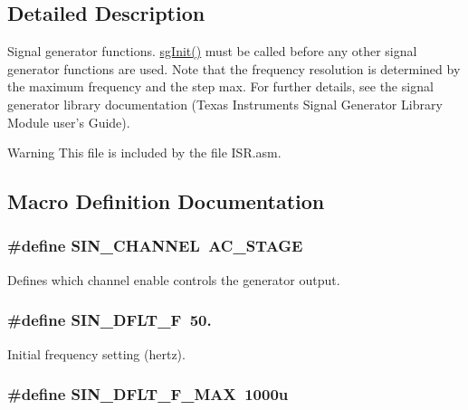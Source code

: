 \subsection{Detailed Description}
Signal generator functions. \hyperlink{a00032_a41e810f7181a4ecaa5bc5f0713c6db89}{sg\-Init()} must be called before any other signal generator functions are used. Note that the frequency resolution is determined by the maximum frequency and the step max. For further details, see the signal generator library documentation (Texas Instruments Signal Generator Library Module user's Guide).

\begin{DoxyWarning}{Warning}
This file is included by the file I\-S\-R.\-asm. 
\end{DoxyWarning}


\subsection{Macro Definition Documentation}
\hypertarget{a00032_a71b6211a4d077af219d7e503f17114d1}{
\subsubsection[{S\-I\-N\-\_\-\-C\-H\-A\-N\-N\-E\-L}]{\setlength{\rightskip}{0pt plus 5cm}\#define S\-I\-N\-\_\-\-C\-H\-A\-N\-N\-E\-L~{\bf A\-C\-\_\-\-S\-T\-A\-G\-E}}}\label{a00032_a71b6211a4d077af219d7e503f17114d1}
Defines which channel enable controls the generator output. \hypertarget{a00032_aa1d98c477c6de604fc6ca986f2d83238}{
\subsubsection[{S\-I\-N\-\_\-\-D\-F\-L\-T\-\_\-\-F}]{\setlength{\rightskip}{0pt plus 5cm}\#define S\-I\-N\-\_\-\-D\-F\-L\-T\-\_\-\-F~50.}}\label{a00032_aa1d98c477c6de604fc6ca986f2d83238}
Initial frequency setting (hertz). \hypertarget{a00032_a1640e33dcd5a970b4a9731ec68125bd6}{
\subsubsection[{S\-I\-N\-\_\-\-D\-F\-L\-T\-\_\-\-F\-\_\-\-M\-A\-X}]{\setlength{\rightskip}{0pt plus 5cm}\#define S\-I\-N\-\_\-\-D\-F\-L\-T\-\_\-\-F\-\_\-\-M\-A\-X~1000u}}\label{a00032_a1640e33dcd5a970b4a9731ec68125bd6}
